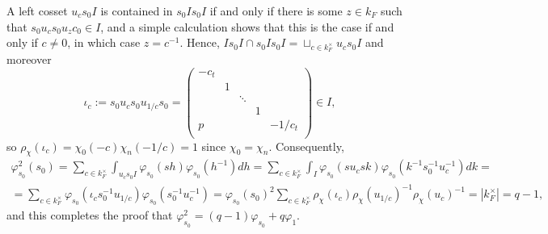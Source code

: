 \documentclass{article}
\theoremstyle{plain}
\theoremstyle{definition}
\begin{document}
    A left cosset $u_cs_0I$ is contained in $s_0Is_0I$ if and only if there is some $z\in k_F$ such that $s_0u_cs_0u_zc_0\in I$, and a simple calculation shows that this is the case if and only if $c\neq 0$, in which case $z=c^{-1}$. Hence, $Is_0I\cap s_0Is_0I=\sqcup_{c\in k_F^\times}u_cs_0I$ and moreover 
    $$\iota_c:=s_0u_cs_0u_{1/c}s_0=\begin{pmatrix}
        -c_t &&&& \\
        & 1 &&& \\
        && \ddots && \\
        &&& 1 & \\
        p &&&& -1/c_t \\
    \end{pmatrix}\in I,$$
    so $\rho_\chi(\iota_c)=\chi_0(-c)\chi_n(-1/c)=1$ since $\chi_0=\chi_n$. Consequently, 
    \begin{align*}
        \varphi_{s_0}^2(s_0)=\sum_{c\in k_F^\times}\int_{u_cs_0I}\varphi_{s_0}(sh)\varphi_{s_0}(h^{-1})dh=\sum_{c\in k_F^\times}\int_{I}\varphi_{s_0}(su_csk)\varphi_{s_0}(k^{-1}s_0^{-1}u_c^{-1})dk=\\
        =\sum_{c\in k_F^\times}\varphi_{s_0}(\iota_cs_0^{-1}u_{1/c})\varphi_{s_0}(s_0^{-1}u_c^{-1})=\varphi_{s_0}(s_0)^2\sum_{c\in k_F^\times}\rho_\chi(\iota_c)\rho_\chi(u_{1/c})^{-1}\rho_\chi(u_c)^{-1}=|k_F^\times|=q-1,
    \end{align*}
    and this completes the proof that $\varphi_{s_0}^2=(q-1)\varphi_{s_0}+q\varphi_1$.
    
\end{document}
